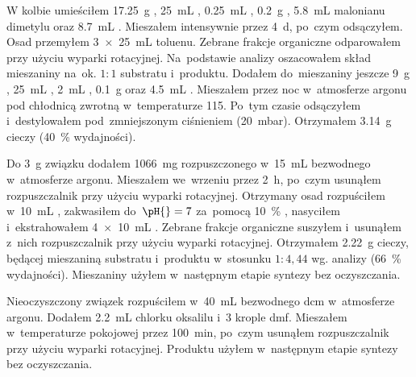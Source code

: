 W kolbie umieściłem \SI{17.25}{\gram} , \SI{25}{\mL} ,
  \SI{0.25}{\mL} , \SI{0.2}{\gram} , \SI{5.8}{\mL}
  malonianu dimetylu oraz \SI{8.7}{\mL} .
Mieszałem intensywnie przez \SI{4}{\day}, po~czym odsączyłem.
Osad przemyłem \SI[product-units = single]{3 x 25}{\mL} toluenu.
Zebrane frakcje organiczne odparowałem przy użyciu wyparki rotacyjnej.
Na~podstawie analizy \NMR*{} oszacowałem skład mieszaniny na~ok. $1:1$ substratu i~produktu.
Dodałem do~mieszaniny jeszcze \SI{9}{\gram} , \SI{25}{\mL} ,
  \SI{2}{\mL} , \SI{0.1}{\gram}  oraz \SI{4.5}{\mL}
  .
Mieszałem przez noc w~atmosferze argonu pod chłodnicą zwrotną w~temperaturze \SI{115}{\degC}.
Po~tym czasie odsączyłem i~destylowałem pod~zmniejszonym ciśnieniem (\SI{20}{\milli\bar}).
Otrzymałem \SI{3.14}{\gram} cieczy (\SI{40}{\percent} wydajności).

Do \SI{3}{\gram} związku  dodałem \SI{1066}{\milli\gram}
   rozpuszczonego w~\SI{15}{\mL} bezwodnego  w~atmosferze argonu.
Mieszałem we~wrzeniu przez \SI{2}{\hour}, po~czym usunąłem rozpuszczalnik
  przy użyciu wyparki rotacyjnej.
Otrzymany osad rozpuściłem w~\SI{10}{\mL} , zakwasiłem do~$\pH{}=7$ za~pomocą
  \SI{10}{\percent} , nasyciłem  i~ekstrahowałem
  \SI[product-units = single]{4 x 10}{\mL} .
Zebrane frakcje organiczne suszyłem  i~usunąłem z~nich rozpuszczalnik
  przy użyciu wyparki rotacyjnej.
Otrzymałem \SI{2.22}{\gram} cieczy, będącej mieszaniną substratu i~produktu w~stosunku
  $1:4,44$ wg. analizy {\NMR*} (\SI{66}{\percent} wydajności).
Mieszaniny użyłem w~następnym etapie syntezy bez oczyszczania.

Nieoczyszczony związek  rozpuściłem w~\SI{40}{\mL}
  bezwodnego \gls{dcm} w~atmosferze argonu. Dodałem \SI{2.2}{\mL} chlorku oksalilu
  i~\num{3} krople \gls{dmf}.
Mieszałem w~temperaturze pokojowej przez \SI{100}{\minute}, po~czym usunąłem rozpuszczalnik
  przy użyciu wyparki rotacyjnej.
Produktu użyłem w~następnym etapie syntezy bez oczyszczania.

